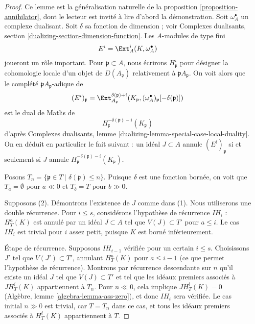 \begin{proof}
Ce lemme est la généralisation naturelle de la proposition \ref{proposition-annihilator}, dont le lecteur est invité à lire d'abord la démonstration. Soit $\omega_A^\bullet$ un complexe dualisant. Soit $\delta$ sa fonction de dimension ; voir Complexes dualisants, section \ref{dualizing-section-dimension-function}. Les $A$-modules de type fini
$$
E^i = \Ext_A^i(K, \omega_A^\bullet)
$$
joueront un rôle important. Pour $\mathfrak p \subset A$, nous écrirons $H^i_\mathfrak p$ pour désigner la cohomologie locale d'un objet de $D(A_\mathfrak p)$ relativement à $\mathfrak pA_\mathfrak p$. On voit alors que le complété $\mathfrak pA_\mathfrak p$-adique de
$$
(E^i)_\mathfrak p =
\Ext^{\delta(\mathfrak p) + i}_{A_\mathfrak p}(K_\mathfrak p,
(\omega_A^\bullet)_\mathfrak p[-\delta(\mathfrak p)])
$$
est le dual de Matlis de
$$
H^{-\delta(\mathfrak p) - i}_{\mathfrak p}(K_\mathfrak p)
$$
d'après Complexes dualisants, lemme \ref{dualizing-lemma-special-case-local-duality}. On en déduit en particulier le fait suivant : un idéal $J \subset A$ annule $(E^i)_\mathfrak p$ si et seulement si $J$ annule $H^{-\delta(\mathfrak p) - i}_{\mathfrak p}(K_\mathfrak p)$.

\medskip\noindent
Posons $T_n = \{\mathfrak p \in T \mid \delta(\mathfrak p) \leq n\}$. Puisque $\delta$ est une fonction bornée, on voit que $T_a = \emptyset$ pour $a \ll 0$ et $T_b = T$ pour $b \gg 0$.

\medskip\noindent
Supposons (2). Démontrons l'existence de $J$ comme dans (1). Nous utiliserons une double récurrence. Pour $i \leq s$, considérons l'hypothèse de récurrence $IH_i$ : $H^a_T(K)$ est annulé par un idéal $J \subset A$ tel que $V(J) \subset T'$ pour $a \leq i$. Le cas $IH_i$ est trivial pour $i$ assez petit, puisque $K$ est borné inférieurement.

\medskip\noindent
Étape de récurrence. Supposons $IH_{i - 1}$ vérifiée pour un certain $i \leq s$. Choisissons $J'$ tel que $V(J') \subset T'$, annulant $H^a_T(K)$ pour $a \leq i - 1$ (ce que permet l'hypothèse de récurrence). Montrons par récurrence descendante sur $n$ qu'il existe un idéal $J$ tel que $V(J) \subset T'$ et tel que les idéaux premiers associés à $J H^i_T(K)$ appartiennent à $T_n$. Pour $n \ll 0$, cela implique $JH^i_T(K) = 0$ (Algèbre, lemme \ref{algebra-lemma-ass-zero}), et donc $IH_i$ sera vérifiée. Le cas initial $n \gg 0$ est trivial, car $T = T_n$ dans ce cas, et tous les idéaux premiers associés à $H^i_T(K)$ appartiennent à $T$.


\end{proof}
